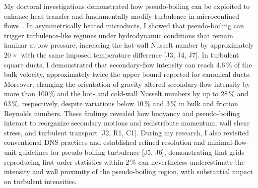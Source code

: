 \documentclass[11pt]{article}
\begin{document}
My doctoral investigations demonstrated how pseudo-boiling can be exploited to enhance heat transfer and fundamentally modify turbulence in microconfined flows~\cite{Hurtan2025,Bernades2023,Bernades2025}.
In asymmetrically heated microducts, I showed that pseudo-boiling can trigger turbulence-like regimes under hydrodynamic conditions that remain laminar at low pressure, increasing the hot-wall Nusselt number by approximately $20\times$ with the same imposed temperature difference [J3, J4, J7].
In turbulent square ducts, I demonstrated that secondary-flow intensity can reach 4.6\,\% of the bulk velocity, approximately twice the upper bound reported for canonical ducts.
Moreover, changing the orientation of gravity altered secondary-flow intensity by more than 100\,\% and the hot- and cold-wall Nusselt numbers by up to 28\,\% and 63\,\%, respectively, despite variations below 10\,\% and 3\,\% in bulk and friction Reynolds numbers.
These findings revealed how buoyancy and pseudo-boiling interact to reorganize secondary motions and redistribute momentum, wall shear stress, and turbulent transport [J2, R1, C1].
During my research, I also revisited conventional DNS practices and established refined resolution and minimal-flow-unit guidelines for pseudo-boiling turbulence [J5, J6], demonstrating that grids reproducing first-order statistics within 2\,\% can nevertheless underestimate the intensity and wall proximity of the pseudo-boiling region, with substantial impact on turbulent intensities.
\end{document}
